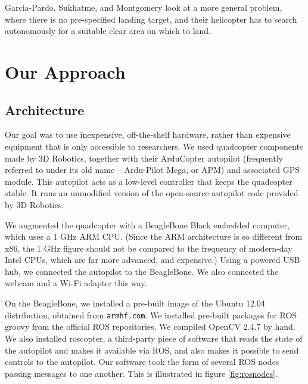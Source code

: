 \documentclass[10pt]{scrartcl} %
\begin{document}
Garcia-Pardo, Sukhatme, and Montgomery \cite{garcia_pardo_et_al_2002} look at a
more general problem, where there is no pre-specified landing target, and their
helicopter has to search autonomously for a suitable clear area on which to
land.


\section{Our Approach}

\subsection{Architecture}

Our goal was to use inexpensive, off-the-shelf hardware, rather than expensive
equipment that is only accessible to researchers. We used quadcopter components
made by 3D Robotics, together with their ArduCopter autopilot (frequently
referred to under its old name -- Ardu-Pilot Mega, or APM) and associated GPS
module. This autopilot acts as a low-level controller that keeps the quadcopter
stable. It runs an unmodified version of the open-source autopilot code
provided by 3D Robotics.

We augmented the quadcopter with a BeagleBone Black embedded computer, which
uses a 1 GHz ARM CPU. (Since the ARM architecture is so different from x86,
the 1 GHz figure should not be compared to the frequency of modern-day Intel
CPUs, which are far more advanced, and expensive.) Using a powered USB hub, we
connected the autopilot to the BeagleBone. We also connected the webcam and a
Wi-Fi adapter this way.


On the BeagleBone, we installed a pre-built image of the Ubuntu 12.04
distribution, obtained from {\tt armhf.com}. We installed pre-built packages
for ROS groovy from the official ROS repositories. We compiled OpenCV 2.4.7 by
hand. We also installed roscopter, a third-party piece of software that reads
the state of the autopilot and makes it available via ROS, and also makes it
possible to send controls to the autopilot. Our software took the form of
several ROS nodes passing messages to one another. This is illustrated in
figure \ref{fig:rosnodes}.
\end{document}

